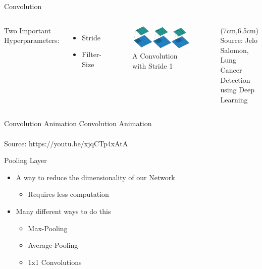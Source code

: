 \documentclass[citestyle=authoryear,bibstyle=numeric,hyperref,backend=biber]{sdqbeamer}
\begin{document}
\begin{frame}{Convolution}
\begin{columns}
    Two Important Hyperparameters:
    \begin{itemize}
        \item Stride
        \item Filter-Size
    \end{itemize}

    \begin{figure}
        \centering
        \includegraphics[width=1\textwidth]{pictures/stride1.jpg}
        \caption{A Convolution with Stride 1}
        \label{fig:stride1-conv}
    \end{figure}
    \begin{textblock*}{6cm}(7cm,6.5cm) %
             \tiny{Source: Jelo Salomon, Lung Cancer Detection using Deep Learning}
        \end{textblock*}
\end{columns}
\end{frame}


\begin{frame}{Convolution Animation}
Convolution Animation \\
\\
\tiny{Source: https://youtu.be/xjqCTp4xAtA}
\end{frame}

\begin{frame}{Pooling Layer}
    \begin{itemize}
        \item A way to reduce the dimensionality of our Network
        \begin{itemize}
            \item Requires less computation
        \end{itemize}
        \item Many different ways to do this
        \begin{itemize}
            \item Max-Pooling
            \item Average-Pooling
            \item 1x1 Convolutions
        \end{itemize}
    \end{itemize}
\end{frame}
\end{document}
